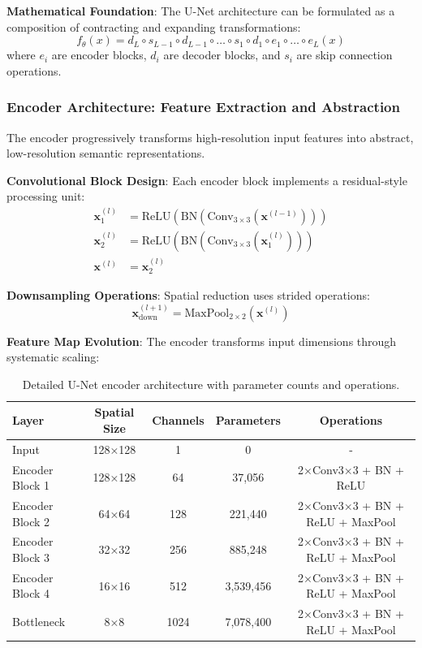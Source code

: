 \documentclass[12pt,a4paper]{article}
\begin{document}
\textbf{Mathematical Foundation}:
The U-Net architecture can be formulated as a composition of contracting and expanding transformations:
\begin{equation}
f_{\theta}(x) = d_L \circ s_{L-1} \circ d_{L-1} \circ \dots \circ s_1 \circ d_1 \circ e_1 \circ \dots \circ e_L(x)
\end{equation}
where $e_i$ are encoder blocks, $d_i$ are decoder blocks, and $s_i$ are skip connection operations.

\subsubsection{Encoder Architecture: Feature Extraction and Abstraction}

The encoder progressively transforms high-resolution input features into abstract, low-resolution semantic representations.

\textbf{Convolutional Block Design}:
Each encoder block implements a residual-style processing unit:
\begin{align}
\mathbf{x}^{(l)}_{1} &= \text{ReLU}(\text{BN}(\text{Conv}_{3\times3}(\mathbf{x}^{(l-1)}))) \\
\mathbf{x}^{(l)}_{2} &= \text{ReLU}(\text{BN}(\text{Conv}_{3\times3}(\mathbf{x}^{(l)}_{1}))) \\
\mathbf{x}^{(l)} &= \mathbf{x}^{(l)}_{2}
\end{align}

\textbf{Downsampling Operations}:
Spatial reduction uses strided operations:
\begin{equation}
\mathbf{x}^{(l+1)}_{\text{down}} = \text{MaxPool}_{2\times2}(\mathbf{x}^{(l)})
\end{equation}

\textbf{Feature Map Evolution}:
The encoder transforms input dimensions through systematic scaling:
\begin{table}[H]
    \centering
    \begin{tabular}{lcccc}
        \toprule
        \textbf{Layer} & \textbf{Spatial Size} & \textbf{Channels} & \textbf{Parameters} & \textbf{Operations} \\
        \midrule
        Input & 128×128 & 1 & 0 & - \\
        Encoder Block 1 & 128×128 & 64 & 37,056 & 2×Conv3×3 + BN + ReLU \\
        Encoder Block 2 & 64×64 & 128 & 221,440 & 2×Conv3×3 + BN + ReLU + MaxPool \\
        Encoder Block 3 & 32×32 & 256 & 885,248 & 2×Conv3×3 + BN + ReLU + MaxPool \\
        Encoder Block 4 & 16×16 & 512 & 3,539,456 & 2×Conv3×3 + BN + ReLU + MaxPool \\
        Bottleneck & 8×8 & 1024 & 7,078,400 & 2×Conv3×3 + BN + ReLU + MaxPool \\
        \bottomrule
    \end{tabular}
    \caption{Detailed U-Net encoder architecture with parameter counts and operations.}
    \label{tab:unet_encoder_detailed}
\end{table}
\end{document}
